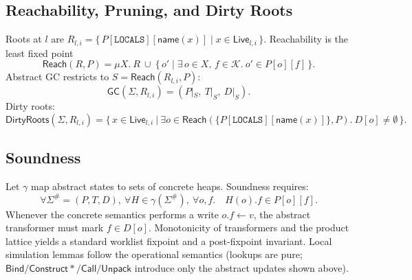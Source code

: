 \subsection{Reachability, Pruning, and Dirty Roots}

Roots at \(l\) are
\(R_{l,i}=\{\,P[\mathtt{LOCALS}][\mathsf{name}(x)] \mid x\in \mathsf{Live}_{l,i}\,\}\).
Reachability is the least fixed point
\[
\mathsf{Reach}(R,P)=\mu X.\ R\ \cup\ \{\,o' \mid \exists\,o\in X,\, f\in\mathcal{K}.\ o'\in P[o][f] \,\}.
\]
Abstract GC restricts to \(S=\mathsf{Reach}(R_{l,i},P)\):
\[
\mathsf{GC}(\Sigma,R_{l,i})=(P|_S,\ T|_S,\ D|_S).
\]
Dirty roots:
\[
\mathsf{DirtyRoots}(\Sigma,R_{l,i})=\big\{\, x\in \mathsf{Live}_{l,i}\ \big|\ \exists o\in \mathsf{Reach}(\{P[\mathtt{LOCALS}][\mathsf{name}(x)]\},P).\ D[o]\neq \emptyset \,\big\}.
\]

\subsection{Soundness}

Let \(\gamma\) map abstract states to sets of concrete heaps. Soundness requires:
\[
\forall \Sigma^\#=(P,T,D),\ \forall H\in \gamma(\Sigma^\#),\ \forall o,f.\quad H(o).f \in P[o][f].
\]
Whenever the concrete semantics performs a write \(o.f\leftarrow v\), the abstract transformer must
mark \(f\in D[o]\). Monotonicity of transformers and the product lattice yields a standard
worklist fixpoint and a post-fixpoint invariant. Local simulation lemmas follow the \spytecode
operational semantics (lookups are pure; \(\mathsf{Bind}/\mathsf{Construct*}/\mathsf{Call}/\mathsf{Unpack}\) introduce only the abstract updates shown above).
